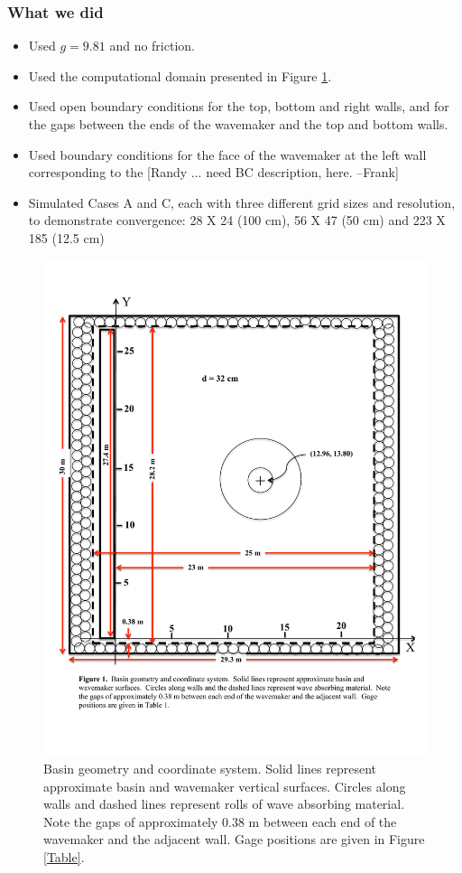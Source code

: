 \subsubsection{What we did}

\begin{itemize}
\item Used $g=9.81$ and no friction.
\item Used the computational domain presented in Figure \ref{Domain}.
\item Used open boundary conditions for the top, bottom and right walls, and for the gaps between the ends of the wavemaker and the top and bottom walls.
\item Used boundary conditions for the face of the wavemaker at the left wall corresponding to the [Randy ... need BC description, here.  --Frank]  
\item Simulated Cases A and C, each with three different grid sizes and resolution, to demonstrate convergence:  28 X 24 (100 cm), 56 X 47 (50 cm) and  223 X 185 (12.5 cm)
\end{itemize}

\begin{figure}[ht]
\hfil\includegraphics[width=6.0in]{bp6/Domain.pdf}\hfil
\caption{\label{Domain}
Basin geometry and coordinate system.  Solid lines represent approximate basin and wavemaker vertical surfaces.  Circles along walls and dashed lines represent rolls of wave absorbing material.  Note the gaps of approximately 0.38 m between each end of the wavemaker and the adjacent wall.  Gage positions are given in Figure \ref{Table}.
  }
\end{figure}

